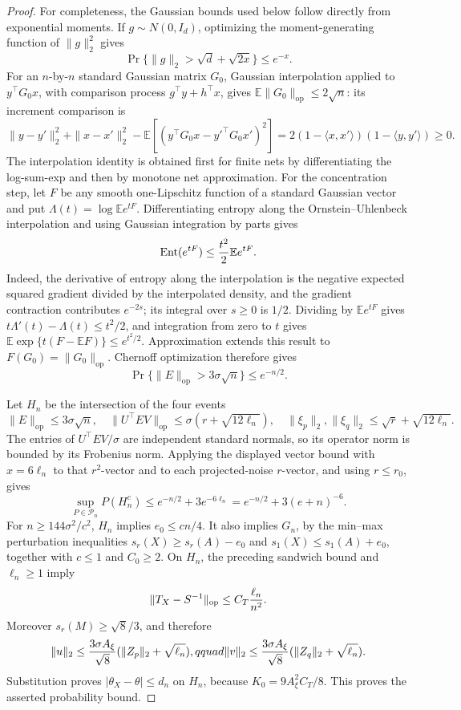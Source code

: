 \documentclass{article}
\begin{document}
\begin{proof}
For completeness, the Gaussian bounds used below follow directly from exponential moments.  If \(g\sim N(0,I_d)\), optimizing the moment-generating function of \(\|g\|_2^2\) gives
\[
 \Pr\{\|g\|_2>\sqrt d+\sqrt{2x}\}\le e^{-x}.
\]
For an \(n\)-by-\(n\) standard Gaussian matrix \(G_0\), Gaussian interpolation applied to \(y^{\top}G_0x\), with comparison process \(g^{\top}y+h^{\top}x\), gives \(\mathbb E\|G_0\|_{\mathrm{op}}\le2\sqrt n\): its increment comparison is
\[
 \|y-y'\|_2^2+\|x-x'\|_2^2-
 \mathbb E[(y^{\top}G_0x-y'^{\top}G_0x')^2]
 =2(1-\langle x,x'\rangle)(1-\langle y,y'\rangle)\ge0.
\]
The interpolation identity is obtained first for finite nets by differentiating the log-sum-exp and then by monotone net approximation.  For the concentration step, let \(F\) be any smooth one-Lipschitz function of a standard Gaussian vector and put \(\Lambda(t)=\log\mathbb E e^{tF}\).  Differentiating entropy along the Ornstein--Uhlenbeck interpolation and using Gaussian integration by parts gives
\[
 \operatorname{Ent}(e^{tF})\le {t^2\over2}\mathbb E e^{tF}.
\]
Indeed, the derivative of entropy along the interpolation is the negative expected squared gradient divided by the interpolated density, and the gradient contraction contributes \(e^{-2s}\); its integral over \(s\ge0\) is \(1/2\).  Dividing by \(\mathbb E e^{tF}\) gives \(t\Lambda'(t)-\Lambda(t)\le t^2/2\), and integration from zero to \(t\) gives
\(\mathbb E\exp\{t(F-\mathbb EF)\}\le e^{t^2/2}\).  Approximation extends this result to \(F(G_0)=\|G_0\|_{\mathrm{op}}\).  Chernoff optimization therefore gives
\[
 \Pr\{\|E\|_{\mathrm{op}}>3\sigma\sqrt n\}\le e^{-n/2}.
\]

Let \(H_n\) be the intersection of the four events
\[
 \|E\|_{\mathrm{op}}\le3\sigma\sqrt n,\quad
 \|U^{\top}EV\|_{\mathrm{op}}\le\sigma(r+\sqrt{12\ell_n}),\quad
 \|\xi_p\|_2,\|\xi_q\|_2\le\sqrt r+\sqrt{12\ell_n}.
\]
The entries of \(U^{\top}EV/\sigma\) are independent standard normals, so its operator norm is bounded by its Frobenius norm.  Applying the displayed vector bound with \(x=6\ell_n\) to that \(r^2\)-vector and to each projected-noise \(r\)-vector, and using \(r\le r_0\), gives
\[
 \sup_{P\in\mathcal P_n}P(H_n^c)
 \le e^{-n/2}+3e^{-6\ell_n}
 =e^{-n/2}+3(e+n)^{-6}.
\]
For \(n\ge144\sigma^2/c^2\), \(H_n\) implies \(e_0\le cn/4\).  It also implies \(G_n\), by the min--max perturbation inequalities
\(s_r(X)\ge s_r(A)-e_0\) and \(s_1(X)\le s_1(A)+e_0\), together with \(c\le1\) and \(C_0\ge2\).  On \(H_n\), the preceding sandwich bound and \(\ell_n\ge1\) imply
\[
 \|T_X-S^{-1}\|_{\mathrm{op}}
 \le C_T{\ell_n\over n^2}.
\]
Moreover \(s_r(M)\ge\sqrt8/3\), and therefore
\[
 \|u\|_2\le {3\sigma A_\xi\over\sqrt8}
 (\|Z_p\|_2+\sqrt{\ell_n}),qquad
 \|v\|_2\le {3\sigma A_\xi\over\sqrt8}
 (\|Z_q\|_2+\sqrt{\ell_n}).
\]
Substitution proves \(|\theta_X-\theta|\le d_n\) on \(H_n\), because \(K_0=9A_\xi^2C_T/8\).  This proves the asserted probability bound.


\end{proof}
\end{document}

